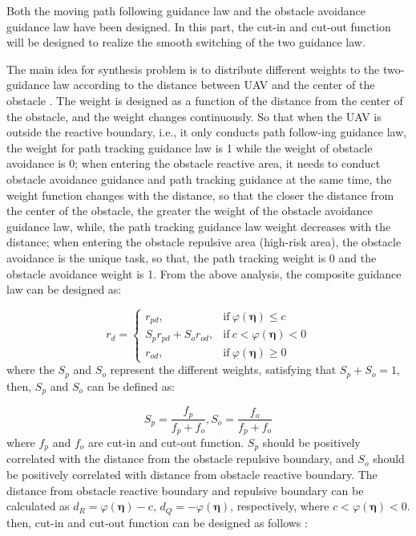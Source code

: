 \documentclass[a4paper, 10pt, conference]{ieeeconf}      %
\begin{document}
Both the moving path following guidance law and the obstacle avoidance guidance law have been designed. In this part, the cut-in and cut-out function will be designed to realize the smooth switching of the two guidance law. 

The main idea for synthesis problem is to distribute different weights to the two-guidance law according to the distance between UAV and the center of the obstacle \cite{c22}. The weight is designed as a function of the distance from the center of the obstacle, and the weight changes continuously. So that when the UAV is outside the reactive boundary, i.e., it only conducts path follow-ing guidance law, the weight for path tracking guidance law is 1 while the weight of obstacle avoidance is 0; when entering the obstacle reactive area, it needs to conduct obstacle avoidance guidance and path tracking guidance at the same time, the weight function changes with the distance, so that the closer the distance from the center of the obstacle, the greater the weight of the obstacle avoidance guidance law, while, the path tracking guidance law weight decreases with the distance; when entering the obstacle repulsive area (high-risk area), the obstacle avoidance is the unique task, so that, the path tracking weight is 0 and the obstacle avoidance weight is 1. From the above analysis, the composite guidance law can be designed as:

\begin{equation}\label{eq27}
	r_d=\begin{cases}
		r_{pd},&\mbox{if}~\varphi(\bm{\eta})\leq c\\
		S_p r_{pd}+S_o r_{od},&\mbox{if}~c<\varphi(\bm{\eta})<0\\
		r_{od},&\mbox{if}~\varphi(\bm{\eta})\geq 0
	\end{cases}
\end{equation}
where the $S_p$ and $S_o$ represent the different weights, satisfying that $S_p+S_o=1$, then, $S_p$ and $S_o$ can be defined as:

\begin{equation}\label{eq28}
	S_p=\frac{f_p}{f_p+f_o},S_o=\frac{f_o}{f_p+f_o}
\end{equation}
where $f_p$ and $f_o$ are cut-in and cut-out function. $S_p$ should be positively correlated with the distance from the obstacle repulsive boundary, and $S_o$ should be positively correlated with distance from obstacle reactive boundary. The distance from obstacle reactive boundary and repulsive boundary can be calculated as $d_R=\varphi(\bm{\eta})-c$, $d_Q=-\varphi(\bm{\eta})$, respectively, where $c<\varphi(\bm{\eta})<0$. then, cut-in and cut-out function can be designed as follows \cite{c22}:
\end{document}
